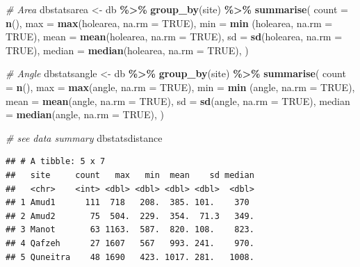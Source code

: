 \documentclass[
]{article}
\newenvironment{Shaded}{\begin{snugshade}}{\end{snugshade}}
\newcommand{\AttributeTok}[1]{\textcolor[rgb]{0.13,0.29,0.53}{#1}}
\newcommand{\CommentTok}[1]{\textcolor[rgb]{0.56,0.35,0.01}{\textit{#1}}}
\newcommand{\ConstantTok}[1]{\textcolor[rgb]{0.56,0.35,0.01}{#1}}
\newcommand{\FunctionTok}[1]{\textcolor[rgb]{0.13,0.29,0.53}{\textbf{#1}}}
\newcommand{\NormalTok}[1]{#1}
\newcommand{\OtherTok}[1]{\textcolor[rgb]{0.56,0.35,0.01}{#1}}
\newcommand{\SpecialCharTok}[1]{\textcolor[rgb]{0.81,0.36,0.00}{\textbf{#1}}}
\begin{document}
\begin{Shaded}
\begin{Highlighting}[]
\CommentTok{\# Area}
\NormalTok{dbstatsarea }\OtherTok{\textless{}{-}}\NormalTok{ db }\SpecialCharTok{\%\textgreater{}\%} \FunctionTok{group\_by}\NormalTok{(site) }\SpecialCharTok{\%\textgreater{}\%}
      \FunctionTok{summarise}\NormalTok{(}
      \AttributeTok{count =} \FunctionTok{n}\NormalTok{(),}
      \AttributeTok{max =} \FunctionTok{max}\NormalTok{(holearea, }\AttributeTok{na.rm =} \ConstantTok{TRUE}\NormalTok{),}
      \AttributeTok{min =} \FunctionTok{min}\NormalTok{ (holearea, }\AttributeTok{na.rm =} \ConstantTok{TRUE}\NormalTok{),}
      \AttributeTok{mean =} \FunctionTok{mean}\NormalTok{(holearea, }\AttributeTok{na.rm =} \ConstantTok{TRUE}\NormalTok{),}
      \AttributeTok{sd =} \FunctionTok{sd}\NormalTok{(holearea, }\AttributeTok{na.rm =} \ConstantTok{TRUE}\NormalTok{),}
      \AttributeTok{median =} \FunctionTok{median}\NormalTok{(holearea, }\AttributeTok{na.rm =} \ConstantTok{TRUE}\NormalTok{),}
\NormalTok{  ) }

\CommentTok{\# Angle}
\NormalTok{dbstatsangle }\OtherTok{\textless{}{-}}\NormalTok{ db }\SpecialCharTok{\%\textgreater{}\%} \FunctionTok{group\_by}\NormalTok{(site) }\SpecialCharTok{\%\textgreater{}\%}
      \FunctionTok{summarise}\NormalTok{(}
      \AttributeTok{count =} \FunctionTok{n}\NormalTok{(),}
      \AttributeTok{max =} \FunctionTok{max}\NormalTok{(angle, }\AttributeTok{na.rm =} \ConstantTok{TRUE}\NormalTok{),}
      \AttributeTok{min =} \FunctionTok{min}\NormalTok{ (angle, }\AttributeTok{na.rm =} \ConstantTok{TRUE}\NormalTok{),}
      \AttributeTok{mean =} \FunctionTok{mean}\NormalTok{(angle, }\AttributeTok{na.rm =} \ConstantTok{TRUE}\NormalTok{),}
      \AttributeTok{sd =} \FunctionTok{sd}\NormalTok{(angle, }\AttributeTok{na.rm =} \ConstantTok{TRUE}\NormalTok{),}
      \AttributeTok{median =} \FunctionTok{median}\NormalTok{(angle, }\AttributeTok{na.rm =} \ConstantTok{TRUE}\NormalTok{),}
\NormalTok{  ) }

\CommentTok{\# see data summary}
\NormalTok{dbstatsdistance}
\end{Highlighting}
\end{Shaded}

\begin{verbatim}
## # A tibble: 5 x 7
##   site     count   max   min  mean    sd median
##   <chr>    <int> <dbl> <dbl> <dbl> <dbl>  <dbl>
## 1 Amud1      111  718   208.  385. 101.    370 
## 2 Amud2       75  504.  229.  354.  71.3   349.
## 3 Manot       63 1163.  587.  820. 108.    823.
## 4 Qafzeh      27 1607   567   993. 241.    970.
## 5 Quneitra    48 1690   423. 1017. 281.   1008.
\end{verbatim}
\end{document}
